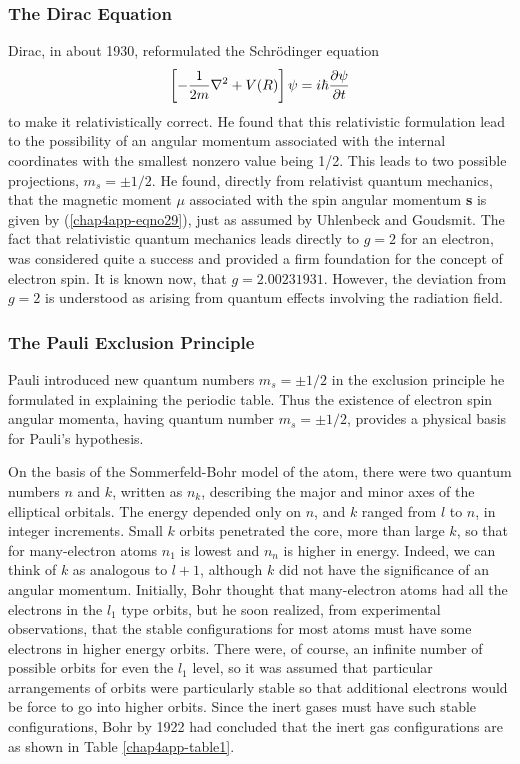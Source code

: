 \subsubsection{The Dirac Equation}

Dirac, in about 1930, reformulated the Schr\"odinger equation
\begin{equation}
\left[ - {1 \over 2m} \nabla^2 + V (R) \right] \psi = i \hbar 
{\partial \psi \over \partial t}
\end{equation}
to make it relativistically correct.  He found that this relativistic
formulation lead to the possibility of an angular momentum associated
with the internal coordinates with the smallest nonzero value being
1/2.  This leads to two possible projections, $m_s = \pm 1/2$.  He
found, directly from relativist quantum mechanics, that the magnetic
moment $\mu$ associated with the spin angular momentum {\bf s} is
given by (\ref{chap4app-eqno29}), just as assumed by Uhlenbeck and
Goudsmit. The fact that relativistic quantum mechanics leads directly
to $g = 2$ for an electron, was considered quite a success and
provided a firm foundation for the concept of electron spin.  It is
known now, that $g = 2.00231931$.  However, the deviation from $g = 2$
is understood as arising from quantum effects involving the radiation
field.

\subsubsection{The Pauli Exclusion Principle}

Pauli introduced new quantum numbers $m_s = \pm 1/2$ in the
exclusion principle he formulated in explaining the periodic table.  
Thus the existence of electron spin angular momenta, having quantum 
number $m_s = \pm 1/2$, provides a physical basis for Pauli's hypothesis.

On the basis of the Sommerfeld-Bohr model of the atom, there were two quantum
numbers $n$ and $k$, written as $n_k$, describing the major and minor axes 
of the elliptical orbitals. The energy depended only on $n$, and $k$ 
ranged from $l$ to $n$, in integer increments.  Small $k$ orbits 
penetrated the core, more than large $k$, so that for many-electron 
atoms $n_1$ is lowest and $n_n$ is higher in energy.  Indeed, we can 
think of $k$ as analogous to $l + 1$, although $k$ did not have the 
significance of an angular momentum.  Initially,
Bohr thought that many-electron atoms had all the electrons in the 
$l_1$ type orbits, but he soon realized, from experimental observations, 
that the stable configurations for most atoms must have some electrons 
in higher energy orbits.  There were, of course, an
infinite number of possible orbits for even the $l_1$ level, so it was 
assumed that particular arrangements of orbits were particularly stable so 
that additional electrons would be force to go into higher
orbits.  Since the inert gases must have such stable configurations, Bohr by
1922 had concluded that the inert gas configurations are as shown in
Table 
\ref{chap4app-table1}.

